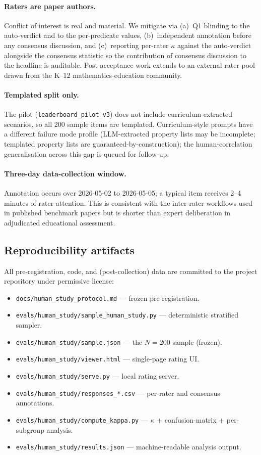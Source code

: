 \paragraph{Raters are paper authors.}
Conflict of interest is real and material.
We mitigate via (a)~Q1 blinding to the auto-verdict and to the per-predicate values, (b)~independent annotation before any consensus discussion, and (c)~reporting per-rater $\kappa$ against the auto-verdict alongside the consensus statistic so the contribution of consensus discussion to the headline is auditable.
Post-acceptance work extends to an external rater pool drawn from the K--12 mathematics-education community.

\paragraph{Templated split only.}
The pilot (\texttt{leaderboard\_pilot\_v3}) does not include curriculum-extracted scenarios, so all 200 sample items are templated.
Curriculum-style prompts have a different failure mode profile (LLM-extracted property lists may be incomplete; templated property lists are guaranteed-by-construction); the human-correlation generalisation across this gap is queued for follow-up.

\paragraph{Three-day data-collection window.}
Annotation occurs over 2026-05-02 to 2026-05-05; a typical item receives 2--4 minutes of rater attention.
This is consistent with the inter-rater workflows used in published benchmark papers but is shorter than expert deliberation in adjudicated educational assessment.

\subsection{Reproducibility artifacts}
\label{app:human_study:artifacts}

All pre-registration, code, and (post-collection) data are committed to the project repository under permissive license:
\begin{itemize}
\item \texttt{docs/human\_study\_protocol.md} --- frozen pre-registration.
\item \texttt{evals/human\_study/sample\_human\_study.py} --- deterministic stratified sampler.
\item \texttt{evals/human\_study/sample.json} --- the $N{=}200$ sample (frozen).
\item \texttt{evals/human\_study/viewer.html} --- single-page rating UI.
\item \texttt{evals/human\_study/serve.py} --- local rating server.
\item \texttt{evals/human\_study/responses\_*.csv} --- per-rater and consensus annotations.
\item \texttt{evals/human\_study/compute\_kappa.py} --- $\kappa$ + confusion-matrix + per-subgroup analysis.
\item \texttt{evals/human\_study/results.json} --- machine-readable analysis output.
\end{itemize}

